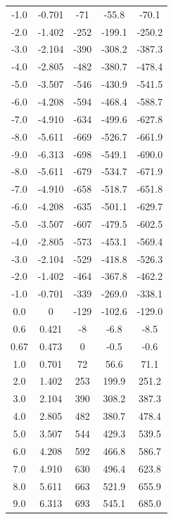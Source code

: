 \begin{table}
\begin{tabular}{S[table-format=1.2] S[table-format=1.3] S[table-format=3.0] S[table-format=3.1] S[table-format=3.1]}
            -1.0    & -0.701   & -71   & -55.8  & -70.1  \\
            -2.0    & -1.402    & -252  & -199.1 & -250.2  \\
            -3.0    & -2.104    & -390  & -308.2 & -387.3  \\
            -4.0    & -2.805    & -482  & -380.7 & -478.4  \\
            -5.0    & -3.507    & -546  & -430.9 & -541.5  \\
            -6.0    & -4.208    & -594  & -468.4 & -588.7  \\
            -7.0    & -4.910    & -634  & -499.6 & -627.8  \\
            -8.0    & -5.611    & -669  & -526.7 & -661.9  \\
            -9.0    & -6.313    & -698  & -549.1 & -690.0  \\
            -8.0    & -5.611    & -679  & -534.7 & -671.9  \\
            -7.0    & -4.910    & -658  & -518.7 & -651.8  \\
            -6.0    & -4.208    & -635  & -501.1 & -629.7  \\
            -5.0    & -3.507    & -607  & -479.5 & -602.5  \\
            -4.0    & -2.805    & -573  & -453.1 & -569.4  \\
            -3.0    & -2.104    & -529  & -418.8 & -526.3  \\
            -2.0    & -1.402    & -464  & -367.8 & -462.2  \\
            -1.0    & -0.701   & -339  & -269.0 & -338.1  \\
            0.0     & 0         & -129  & -102.6 & -129.0  \\
            0.6     & 0.421    & -8    & -6.8   & -8.5  \\
            0.67    & 0.473    & 0     & -0.5   & -0.6  \\
            1.0     & 0.701    & 72    & 56.6   & 71.1  \\
            2.0     & 1.402     & 253   & 199.9  & 251.2  \\
            3.0     & 2.104     & 390   & 308.2  & 387.3  \\
            4.0     & 2.805     & 482   & 380.7  & 478.4  \\
            5.0     & 3.507     & 544   & 429.3  & 539.5  \\
            6.0     & 4.208     & 592   & 466.8  & 586.7  \\
            7.0     & 4.910     & 630   & 496.4  & 623.8  \\
            8.0     & 5.611     & 663   & 521.9  & 655.9  \\
            9.0     & 6.313     & 693   & 545.1  & 685.0  \\
            \bottomrule
        \end{tabular}
    \end{table}
